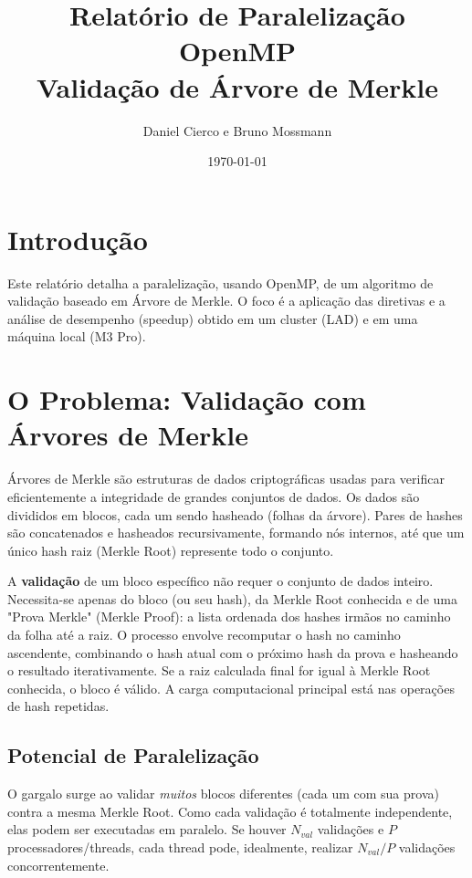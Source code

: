 \documentclass[10pt,a4paper]{article}
\title{Relatório de Paralelização OpenMP \\ Validação de Árvore de Merkle}
\author{Daniel Cierco e Bruno Mossmann}
\date{\today}
\begin{document}
\twocolumn[
\begin{@twocolumnfalse} %
    \maketitle
    \thispagestyle{fancy} %
\end{@twocolumnfalse}
]
\vspace{-2em}

\section*{Introdução}
Este relatório detalha a paralelização, usando OpenMP, de um algoritmo de validação baseado em Árvore de Merkle. O foco é a aplicação das diretivas e a análise de desempenho (speedup) obtido em um cluster (LAD) e em uma máquina local (M3 Pro).

\section*{O Problema: Validação com Árvores de Merkle}
Árvores de Merkle são estruturas de dados criptográficas usadas para verificar eficientemente a integridade de grandes conjuntos de dados. Os dados são divididos em blocos, cada um sendo hasheado (folhas da árvore). Pares de hashes são concatenados e hasheados recursivamente, formando nós internos, até que um único hash raiz (Merkle Root) represente todo o conjunto.

A \textbf{validação} de um bloco específico não requer o conjunto de dados inteiro. Necessita-se apenas do bloco (ou seu hash), da Merkle Root conhecida e de uma "Prova Merkle" (Merkle Proof): a lista ordenada dos hashes irmãos no caminho da folha até a raiz. O processo envolve recomputar o hash no caminho ascendente, combinando o hash atual com o próximo hash da prova e hasheando o resultado iterativamente. Se a raiz calculada final for igual à Merkle Root conhecida, o bloco é válido. A carga computacional principal está nas operações de hash repetidas.

\subsection*{Potencial de Paralelização}
O gargalo surge ao validar \textit{muitos} blocos diferentes (cada um com sua prova) contra a mesma Merkle Root. Como cada validação é totalmente independente, elas podem ser executadas em paralelo. Se houver $N_{val}$ validações e $P$ processadores/threads, cada thread pode, idealmente, realizar $N_{val}/P$ validações concorrentemente.
\end{document}
